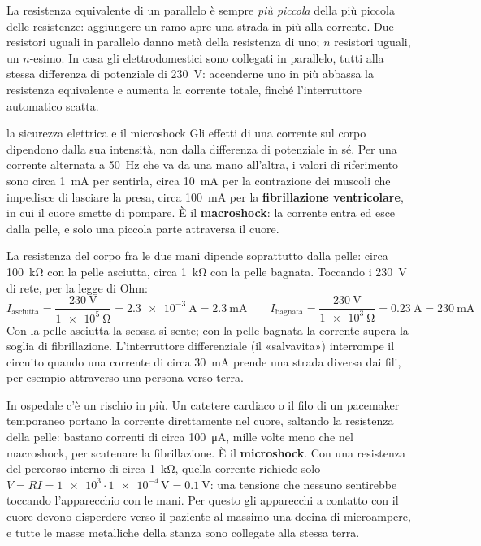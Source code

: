 \begin{attenzione}
La resistenza equivalente di un parallelo è sempre \emph{più piccola} della più piccola delle resistenze: aggiungere un ramo apre una strada in più alla corrente. Due resistori uguali in parallelo danno metà della resistenza di uno; $n$ resistori uguali, un $n$-esimo. In casa gli elettrodomestici sono collegati in parallelo, tutti alla stessa differenza di potenziale di \SI{230}{\volt}: accenderne uno in più abbassa la resistenza equivalente e aumenta la corrente totale, finché l'interruttore automatico scatta.
\end{attenzione}



\begin{applicazione}{la sicurezza elettrica e il microshock}
Gli effetti di una corrente sul corpo dipendono dalla sua intensità, non dalla differenza di potenziale in sé. Per una corrente alternata a \SI{50}{\hertz} che va da una mano all'altra, i valori di riferimento sono circa \SI{1}{\milli\ampere} per sentirla, circa \SI{10}{\milli\ampere} per la contrazione dei muscoli che impedisce di lasciare la presa, circa \SI{100}{\milli\ampere} per la \textbf{fibrillazione ventricolare}, in cui il cuore smette di pompare. È il \textbf{macroshock}: la corrente entra ed esce dalla pelle, e solo una piccola parte attraversa il cuore.

La resistenza del corpo fra le due mani dipende soprattutto dalla pelle: circa \SI{100}{\kilo\ohm} con la pelle asciutta, circa \SI{1}{\kilo\ohm} con la pelle bagnata. Toccando i \SI{230}{\volt} di rete, per la legge di Ohm:
\[
  I_{\text{asciutta}} = \frac{\SI{230}{\volt}}{\SI{1e5}{\ohm}} = \SI{2,3e-3}{\ampere} = \SI{2,3}{\milli\ampere}
  \qquad
  I_{\text{bagnata}} = \frac{\SI{230}{\volt}}{\SI{1e3}{\ohm}} = \SI{0,23}{\ampere} = \SI{230}{\milli\ampere}
\]
Con la pelle asciutta la scossa si sente; con la pelle bagnata la corrente supera la soglia di fibrillazione. L'interruttore differenziale (il «salvavita») interrompe il circuito quando una corrente di circa \SI{30}{\milli\ampere} prende una strada diversa dai fili, per esempio attraverso una persona verso terra.

In ospedale c'è un rischio in più. Un catetere cardiaco o il filo di un pacemaker temporaneo portano la corrente direttamente nel cuore, saltando la resistenza della pelle: bastano correnti di circa \SI{100}{\micro\ampere}, mille volte meno che nel macroshock, per scatenare la fibrillazione. È il \textbf{microshock}. Con una resistenza del percorso interno di circa \SI{1}{\kilo\ohm}, quella corrente richiede solo $V = RI = \num{1e3} \cdot \num{1e-4}\,\si{\volt} = \SI{0,1}{\volt}$: una tensione che nessuno sentirebbe toccando l'apparecchio con le mani. Per questo gli apparecchi a contatto con il cuore devono disperdere verso il paziente al massimo una decina di microampere, e tutte le masse metalliche della stanza sono collegate alla stessa terra.
\end{applicazione}


